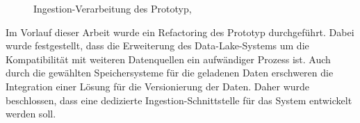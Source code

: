 \begin{figure}
    \centering
    \caption[Ingestion-Verarbeitung des Prototyp]{Ingestion-Verarbeitung des Prototyp, }
    \label{fig:prototyp-ingestion}
\end{figure}

Im Vorlauf dieser Arbeit wurde ein Refactoring des Prototyp durchgeführt.
Dabei wurde festgestellt, dass die Erweiterung des Data-Lake-Systems um die Kompatibilität mit weiteren Datenquellen ein aufwändiger Prozess ist.
Auch durch die gewählten Speichersysteme für die geladenen Daten erschweren die Integration einer Lösung für die Versionierung der Daten.
Daher wurde beschlossen, dass eine dedizierte Ingestion-Schnittstelle für das System entwickelt werden soll.